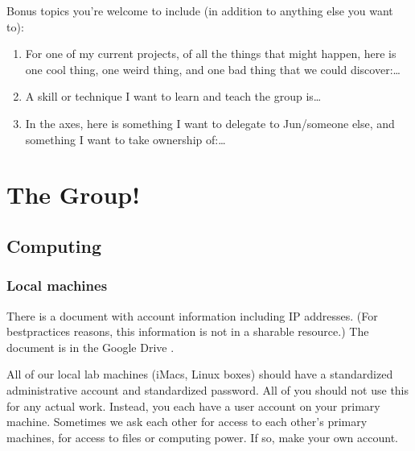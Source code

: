 \documentclass[letterpaper,10pt,english]{sphinxmanual}
\begin{document}
\sphinxAtStartPar
Bonus topics you’re welcome to include (in addition to anything else you want to):
\begin{enumerate}
%
\item {} 
\sphinxAtStartPar
For one of my current projects, of all the things that might happen, here is one cool thing, one weird thing, and one bad thing that we could discover:…

\item {} 
\sphinxAtStartPar
A skill or technique I want to learn and teach the group is…

\item {} 
\sphinxAtStartPar
In the  axes, here is something I want to delegate to Jun/someone else, and something I want to take ownership of:…

\end{enumerate}

\sphinxstepscope


\chapter{The Group!}
\label{\detokenize{05Group:the-group}}\label{\detokenize{05Group::doc}}

\section{Computing}
\label{\detokenize{05Group:computing}}

\subsection{Local  machines}
\label{\detokenize{05Group:local-machines}}
\sphinxAtStartPar
There is a document with account information including IP addresses. (For best\sphinxhyphen{}practices reasons, this information is not in a sharable resource.) The document is in the  Google Drive .

\sphinxAtStartPar
All of our local lab machines (iMacs, Linux boxes) should have a standardized administrative account and standardized password. All of you should not use this for any actual work. Instead, you each have a user account on your primary machine. Sometimes we ask each other for access to each other’s primary machines, for access to files or computing power. If so, make your own account.
\end{document}

